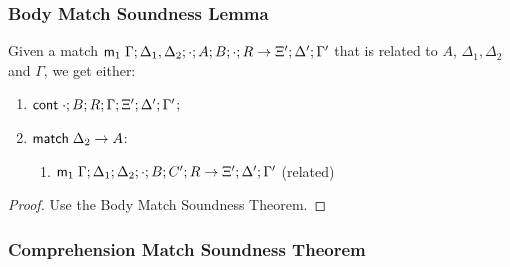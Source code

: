 \subsubsection{Body Match Soundness Lemma}\label{body_match_lemma_persistent}

\begin{lemma}
   Given a match $\mathsf{m}_1 \; \Gamma; \Delta_1, \Delta_2; \cdot; A; B; \cdot; R \rightarrow \Xi'; \Delta'; \Gamma'$ that is related to $A$, $\Delta_1, \Delta_2$ and $\Gamma$, we get either:
   
   \begin{enumerate}
      \item $\mathsf{cont} \; \cdot; B; R; \Gamma; \Xi'; \Delta'; \Gamma'$;
      \item $\mathsf{match} \; \Delta_2 \rightarrow A$:
      \begin{enumerate}
         \item $\mathsf{m}_1 \; \Gamma; \Delta_1; \Delta_2; \cdot; B; C'; R \rightarrow \Xi'; \Delta'; \Gamma'$ (related)
      \end{enumerate}
   \end{enumerate}
   
\end{lemma}

\begin{proof}
   Use the Body Match Soundness Theorem.
\end{proof}

\subsubsection{Comprehension Match Soundness Theorem}

